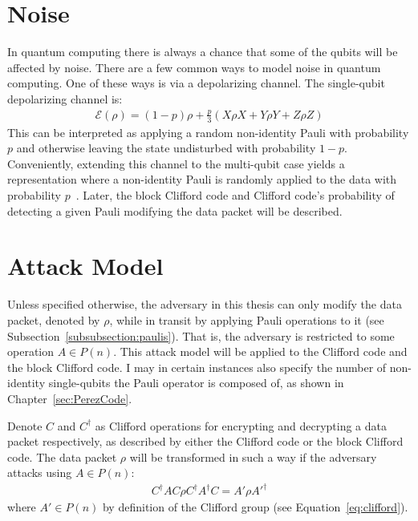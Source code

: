 \section{Noise}
\label{subsec:noise}
In quantum computing there is always a chance that some of the qubits will be affected by noise. There are a few common ways to model noise in quantum computing. One of these ways is via a depolarizing channel. The single-qubit depolarizing channel is:
\begin{align}
\mathcal{E}(\rho)=(1-p) \rho+\frac{p}{3}(X \rho X+Y \rho Y+Z \rho Z)
\end{align}
This can be interpreted as applying a random non-identity Pauli with probability $p$ and otherwise leaving the state undisturbed with probability $1-p$. Conveniently, extending this channel to the multi-qubit case yields a representation where a non-identity Pauli is randomly applied to the data with probability $p$~\cite{qiskitDepolarizingChannel}. Later, the block Clifford code and Clifford code's probability of detecting a given Pauli modifying the data packet will be described.

\section{Attack Model}
\label{section:attackModel}
Unless specified otherwise, the adversary in this thesis can only modify the data packet, denoted by $\rho$, while in transit by applying Pauli operations to it (see Subsection~\ref{subsubsection:paulis}). That is, the adversary is restricted to some operation $A \in P(n)$. This attack model will be applied to the Clifford code and the block Clifford code. I may in certain instances also specify the number of non-identity single-qubits the Pauli operator is composed of, as shown in Chapter~\ref{sec:PerezCode}. 

Denote $C$ and $C^{\dagger}$ as Clifford operations for encrypting and decrypting a data packet respectively, as described by either the Clifford code or the block Clifford code. The data packet $\rho$ will be transformed in such a way if the adversary attacks using $A \in P(n)$: 
\begin{align}
C^{\dagger}AC \rho C^{\dagger}A^{\dagger}C = A' \rho A'^{\dagger}
\end{align}
where $A' \in P(n)$ by definition of the Clifford group (see Equation~\eqref{eq:clifford}).


